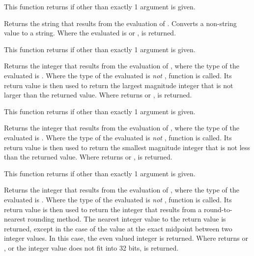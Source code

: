 \begin{description}
    This function returns  if other than exactly 1
    argument is given.

  \item[\Code{String string(AnyType Expr)}]
    Returns the string that results from the evaluation of .
    Converts a non-string value to a string.
    Where the evaluated  is  or ,
     is returned.

    This function returns  if other than exactly 1
    argument is given.

  \item[\Code{Integer floor(AnyType Expr)}]
    Returns the integer that results from the evaluation of ,
    where the type of the evaluated  is .
    Where the type of the evaluated  is \emph{not} ,
    function  is called.
    Its return value is then used to return the largest magnitude
    integer that is not larger than the returned value. 
    Where  returns  or ,
     is returned.

    This function returns  if other than exactly 1
    argument is given.

  \item[\Code{Integer ceiling(AnyType Expr)}]
    Returns the integer that results from the evaluation of ,
    where the type of the evaluated  is .
    Where the type of the evaluated  is \emph{not} ,
    function  is called.
    Its return value is then used to return the smallest magnitude
    integer that is not less than the returned value. 
    Where  returns  or ,
     is returned.

    This function returns  if other than exactly 1
    argument is given.

  \item[\Code{Integer round(AnyType Expr)}]
    Returns the integer that results from the evaluation of ,
    where the type of the evaluated  is .
    Where the type of the evaluated  is \emph{not} ,
    function  is called.
    Its return value is then used to return the 
    integer that results from a round-to-nearest rounding method. 
    The nearest integer value to the return value is returned,
    except in the case of the value at the exact midpoint between
    two integer values.  
    In this case, the even valued integer is returned.
    Where  returns  or ,
    or the integer value does not fit into 32 bits,
     is returned.


\end{description}
